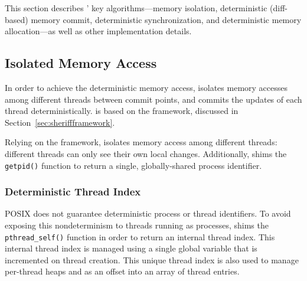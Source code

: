 \label{sec:dthreads-architecture}
This section describes \dthreads{}’ key algorithms—memory isolation, deterministic (diff-based) memory commit, deterministic synchronization, and deterministic memory allocation—as well as other implementation details.

\subsection{Isolated Memory Access}
\label{sec:threadsasprocs}

In order to achieve the deterministic memory access, 
\dthreads{} isolates memory accesses among different
threads between commit points, and commits the updates of each thread deterministically. \dthreads{} is based on the \sheriff{} framework, discussed in Section~\ref{sec:sheriffframework}.

Relying on the \sheriff{} framework, \dthreads{} isolates  memory access among different threads: different threads can only see their own local changes. Additionally, \dthreads{} shims the \texttt{getpid()} function to return a single, globally-shared process identifier. 

\subsubsection{Deterministic Thread Index}
\label{sec:threadindex}

POSIX does not guarantee deterministic process or thread identifiers. To avoid exposing this nondeterminism to threads running as processes, \dthreads{} shims the \texttt{pthread\_self()} function in order to return an internal thread index.  This internal thread index is managed using a single global variable that is incremented on thread creation.  This unique thread index is also used to manage per-thread heaps and as an offset into an array of thread entries.

